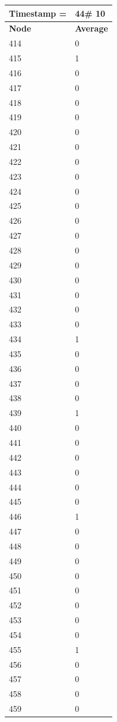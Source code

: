 \begin{tabular}{|l||l|}
\hline
\textbf{Timestamp =} & \textbf{44}\# 10\\\hline
	\textbf{Node} & \textbf{Average} \\ \hline
\hline
	414 & 0 \\ \hline
	415 & 1 \\ \hline
	416 & 0 \\ \hline
	417 & 0 \\ \hline
	418 & 0 \\ \hline
	419 & 0 \\ \hline
	420 & 0 \\ \hline
	421 & 0 \\ \hline
	422 & 0 \\ \hline
	423 & 0 \\ \hline
	424 & 0 \\ \hline
	425 & 0 \\ \hline
	426 & 0 \\ \hline
	427 & 0 \\ \hline
	428 & 0 \\ \hline
	429 & 0 \\ \hline
	430 & 0 \\ \hline
	431 & 0 \\ \hline
	432 & 0 \\ \hline
	433 & 0 \\ \hline
	434 & 1 \\ \hline
	435 & 0 \\ \hline
	436 & 0 \\ \hline
	437 & 0 \\ \hline
	438 & 0 \\ \hline
	439 & 1 \\ \hline
	440 & 0 \\ \hline
	441 & 0 \\ \hline
	442 & 0 \\ \hline
	443 & 0 \\ \hline
	444 & 0 \\ \hline
	445 & 0 \\ \hline
	446 & 1 \\ \hline
	447 & 0 \\ \hline
	448 & 0 \\ \hline
	449 & 0 \\ \hline
	450 & 0 \\ \hline
	451 & 0 \\ \hline
	452 & 0 \\ \hline
	453 & 0 \\ \hline
	454 & 0 \\ \hline
	455 & 1 \\ \hline
	456 & 0 \\ \hline
	457 & 0 \\ \hline
	458 & 0 \\ \hline
	459 & 0 \\ \hline
\end{tabular}
